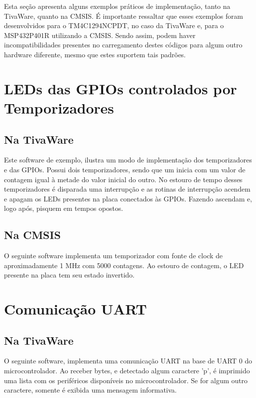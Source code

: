 Esta seção apresenta alguns exemplos práticos de implementação, tanto na TivaWare, quanto na CMSIS. É importante ressaltar que esses exemplos foram desenvolvidos para o TM4C1294NCPDT, no caso da TivaWare e, para o MSP432P401R utilizando a CMSIS. Sendo assim, podem haver incompatibilidades presentes no carregamento destes códigos para algum outro hardware diferente, mesmo que estes suportem tais padrões.

\minitocsection

\section{LEDs das GPIOs controlados por Temporizadores}
\label{sec:exTimer}

\subsection{Na TivaWare}
Este software de exemplo, ilustra um modo de implementação dos temporizadores e das GPIOs. Possui dois temporizadores, sendo que um inicia com um valor de contagem igual à metade do valor inicial do outro. No estouro de tempo desses temporizadores é disparada uma interrupção e as rotinas de interrupção acendem e apagam os LEDs presentes na placa conectados às GPIOs. Fazendo ascendam e, logo após, pisquem em tempos opostos.



\subsection{Na CMSIS}
O seguinte software implementa um temporizador com fonte de clock de aproximadamente 1 MHz com 5000 contagens. Ao estouro de contagem, o LED presente na placa tem seu estado invertido.



\section{Comunicação UART}
\label{sec:exUart}

\subsection{Na TivaWare}
O seguinte software, implementa uma comunicação UART na base de UART 0 do microcontrolador. Ao receber bytes, e detectado algum caractere 'p', é imprimido uma lista com os periféricos disponíveis no microcontrolador. Se for algum outro caractere, somente é exibida uma mensagem informativa.

